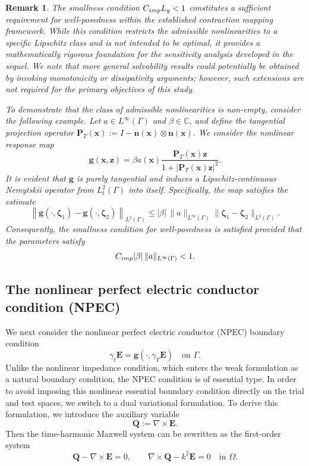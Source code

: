 \documentclass[10pt,a4paper]{amsart}
\newtheorem{rema}[theo]{ Remark}
\numberwithin{equation}{section}
\begin{document}
\begin{rema}
The smallness condition $C_{\rm imp} L_g < 1$ constitutes a sufficient requirement for well-posedness within the established contraction mapping framework. While this condition restricts the admissible nonlinearities to a specific Lipschitz class and is not intended to be optimal, it provides a mathematically rigorous foundation for the sensitivity analysis developed in the sequel. We note that more general solvability results could potentially be obtained by invoking monotonicity or dissipativity arguments; however, such extensions are not required for the primary objectives of this study.

To demonstrate that the class of admissible nonlinearities is non-empty, consider the following example. Let $a \in L^\infty(\Gamma)$ and $\beta \in \mathbb{C}$, and define the tangential projection operator $\mathbf{P}_T(\boldsymbol{x}) := I - \mathbf{n}(\boldsymbol{x}) \otimes \mathbf{n}(\boldsymbol{x})$. We consider the nonlinear response map
\[
\mathbf{g}(\boldsymbol{x}, \boldsymbol{z}) = \beta a(\boldsymbol{x}) \frac{\mathbf{P}_T(\boldsymbol{x}) \boldsymbol{z}}{1 + |\mathbf{P}_T(\boldsymbol{x}) \boldsymbol{z}|^2}.
\]
It is evident that $\mathbf{g}$ is purely tangential and induces a Lipschitz-continuous Nemytskii operator from $L_t^2(\Gamma)$ into itself. Specifically, the map satisfies the estimate
\[
\left\| \mathbf{g}(\cdot, \boldsymbol{\zeta}_1) - \mathbf{g}(\cdot, \boldsymbol{\zeta}_2) \right\|_{L^2(\Gamma)} \le |\beta| \, \|a\|_{L^\infty(\Gamma)} \|\boldsymbol{\zeta}_1 - \boldsymbol{\zeta}_2\|_{L^2(\Gamma)}.
\]
Consequently, the smallness condition for well-posedness is satisfied provided that the parameters satisfy
\[
C_{\rm imp} |\beta| \, \|a\|_{L^\infty(\Gamma)} < 1.
\]
\end{rema}



\subsection{The nonlinear perfect electric conductor condition (NPEC)}

We next consider the nonlinear perfect electric conductor (NPEC) boundary
condition
\begin{equation}\label{eq:npec_boundary_condition}
\gamma_t\mathbf E
=
\mathbf g(\cdot,\gamma_T\mathbf E)
\quad\text{on }\Gamma .
\end{equation}
Unlike the nonlinear impedance condition, which enters the weak formulation
as a natural boundary condition, the NPEC condition is of essential type.
In order to avoid imposing this nonlinear essential boundary condition
directly on the trial and test spaces, we switch to a dual  variational
formulation. To derive this formulation, we introduce the auxiliary variable
\[
\mathbf Q:=\nabla\times\mathbf E .
\]
Then the time-harmonic Maxwell system can be rewritten as the first-order
system
\[
\mathbf Q-\nabla\times\mathbf E=0,
\qquad
\nabla\times\mathbf Q-k^2\mathbf E=0
\quad\text{in }\Omega .
\]
\end{document}
